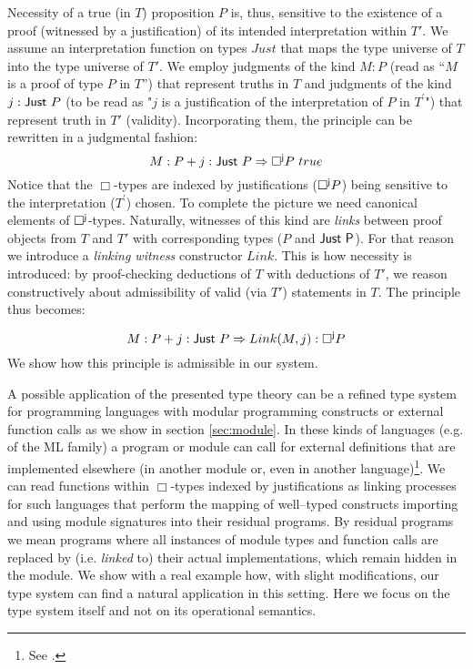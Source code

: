 \documentclass[11pt]{entcs}
\begin{document}
Necessity of a true (in $T$) proposition $P$ is, thus, sensitive to the existence of a proof (witnessed by a justification) of its intended interpretation within $T'$. We assume an interpretation function on types $Just$ that maps the type universe of $T$ into the type universe of $T'$.  We employ judgments of the kind $M:P$ (read as ``$M$ is a proof of type $P$ in $T$'') that represent truths in $T$ and  judgments of the kind $j:{\sf Just}\  P$ (to be read as "$j$ is a justification of the interpretation of $P$ in $T^\prime$") that represent truth in $T'$ (validity). Incorporating them, the principle can be rewritten in a judgmental fashion: $$M:P + j: {\sf Just}\  P \Rightarrow {\sf \Box^{j}}P\ true$$ Notice that the $\Box$-types are indexed by justifications (${\sf\Box^{j}}P$) being sensitive to the interpretation ($T^{\prime}$) chosen.   
To complete the picture we need canonical elements of ${\sf \Box^{j}}$-types. Naturally, witnesses of this kind are \textit{links} between proof objects from $T$ and $T'$ with corresponding types ($P$ and ${\sf Just \ P}$). For that reason we  introduce a \textit{linking witness} constructor {\sf $Link$}. This is how necessity is introduced: by proof-checking deductions of $T$ with deductions of $T'$,  we reason constructively about admissibility of valid (via $T'$) statements in $T$.
The principle thus becomes: 

$$M:P + j: {\sf Just}\   P \Rightarrow Link(M,j):{\sf \Box^{j}}P$$
We show how this principle is admissible in our system.

A possible application of the presented type theory can be a refined type system for programming languages with modular programming constructs or external function calls as we show in section \ref{sec:module}. In these kinds of languages (e.g. of the {\sf ML} family) a program or module can call for external definitions that are implemented elsewhere (in another module or, even in another language)\footnote{See \cite{Harper98programmingin}.}. We can read functions within $\Box$-types indexed by justifications as  linking  processes for such languages that perform  the mapping of well--typed constructs importing and using module signatures into their residual programs. By residual programs we mean programs where all instances of module types and  function calls are replaced by (i.e. \textit{linked} to) their actual implementations, which remain hidden in the module. We show with a real example how, with slight modifications, our type system can find a natural application in this setting. Here we focus on the type system itself and not on its operational semantics. 
\end{document}
